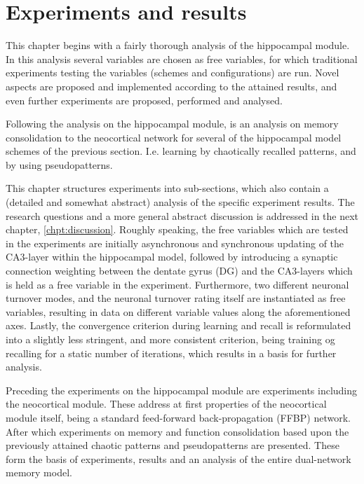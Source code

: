 
\chapter{Experiments and results}\label{chpt:experiments}

This chapter begins with a fairly thorough analysis of the hippocampal module. In this analysis several variables are chosen as free variables, for which traditional experiments testing the variables (schemes and configurations) are run. Novel aspects are proposed and implemented according to the attained results, and even further experiments are proposed, performed and analysed.

Following the analysis on the hippocampal module, is an analysis on memory consolidation to the neocortical network for several of the hippocampal model schemes of the previous section. I.e. learning by chaotically recalled patterns, and by using pseudopatterns.

This chapter structures experiments into sub-sections, which also contain a (detailed and somewhat abstract) analysis of the specific experiment results. The research questions and a more general abstract discussion is addressed in the next chapter, \ref{chpt:discussion}.
Roughly speaking, the free variables which are tested in the experiments are initially asynchronous and synchronous updating of the CA3-layer within the hippocampal model, followed by introducing a synaptic connection weighting between the dentate gyrus (DG) and the CA3-layers which is held as a free variable in the experiment. Furthermore, two different neuronal turnover modes, and the neuronal turnover rating itself are instantiated as free variables, resulting in data on different variable values along the aforementioned axes. Lastly, the convergence criterion during learning and recall is reformulated into a slightly less stringent, and more consistent criterion, being training og recalling for a static number of iterations, which results in a basis for further analysis.

Preceding the experiments on the hippocampal module are experiments including the neocortical module. These address at first properties of the neocortical module itself, being a standard feed-forward back-propagation (FFBP) network. After which experiments on memory and function consolidation based upon the previously attained chaotic patterns and pseudopatterns are presented. These form the basis of experiments, results and an analysis of the entire dual-network memory model.


